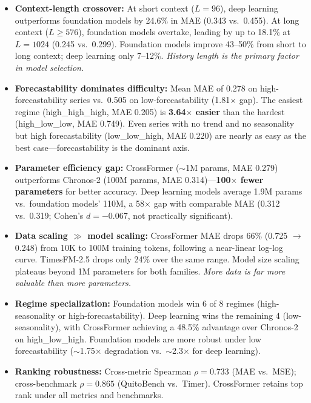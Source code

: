 \documentclass[11pt]{article}
\begin{document}
\begin{itemize}
    \item \textbf{Context-length crossover:} At short context ($L=96$), deep learning outperforms foundation models by 24.6\% in MAE (0.343 vs.\ 0.455). At long context ($L \geq 576$), foundation models overtake, leading by up to 18.1\% at $L=1024$ (0.245 vs.\ 0.299). Foundation models improve 43--50\% from short to long context; deep learning only 7--12\%. \textit{History length is the primary factor in model selection.}

    \item \textbf{Forecastability dominates difficulty:} Mean MAE of 0.278 on high-forecastability series vs.\ 0.505 on low-forecastability (1.81$\times$ gap). The easiest regime (high\_high\_high, MAE 0.205) is \textbf{3.64$\times$ easier} than the hardest (high\_low\_low, MAE 0.749). Even series with no trend and no seasonality but high forecastability (low\_low\_high, MAE 0.220) are nearly as easy as the best case---forecastability is the dominant axis.

    \item \textbf{Parameter efficiency gap:} CrossFormer ($\sim$1M params, MAE 0.279) outperforms Chronos-2 (100M params, MAE 0.314)---\textbf{100$\times$ fewer parameters} for better accuracy. Deep learning models average 1.9M params vs.\ foundation models' 110M, a 58$\times$ gap with comparable MAE (0.312 vs.\ 0.319; Cohen's $d = -0.067$, not practically significant).

    \item \textbf{Data scaling $\gg$ model scaling:} CrossFormer MAE drops 66\% (0.725 $\to$ 0.248) from 10K to 100M training tokens, following a near-linear log-log curve. TimesFM-2.5 drops only 24\% over the same range. Model size scaling plateaus beyond 1M parameters for both families. \textit{More data is far more valuable than more parameters.}

    \item \textbf{Regime specialization:} Foundation models win 6 of 8 regimes (high-seasonality or high-forecastability). Deep learning wins the remaining 4 (low-seasonality), with CrossFormer achieving a 48.5\% advantage over Chronos-2 on high\_low\_high. Foundation models are more robust under low forecastability ($\sim$1.75$\times$ degradation vs.\ $\sim$2.3$\times$ for deep learning).

    \item \textbf{Ranking robustness:} Cross-metric Spearman $\rho = 0.733$ (MAE vs.\ MSE); cross-benchmark $\rho = 0.865$ (QuitoBench vs.\ Timer). CrossFormer retains top rank under all metrics and benchmarks.
\end{itemize}
\end{document}
